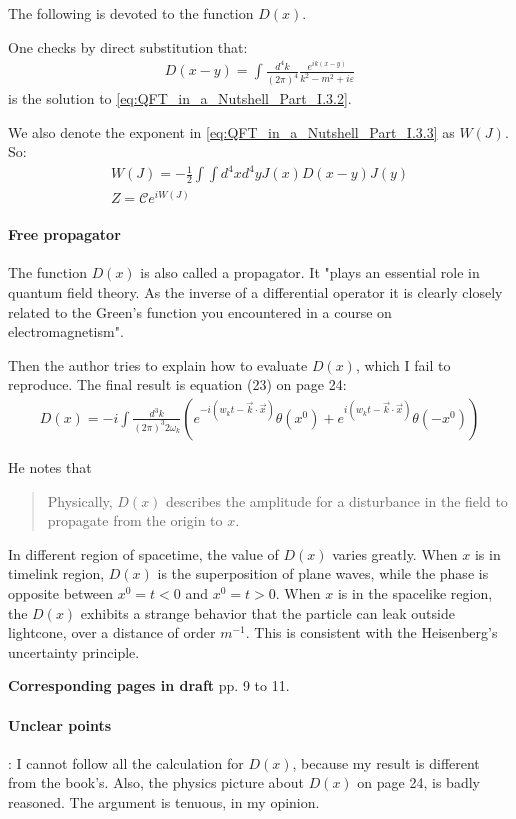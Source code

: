 \documentclass{book}
\numberwithin{equation}{subsection} %
\theoremstyle{definition}
\begin{document}
The following is devoted to the function $D(x)$.

One checks by direct substitution that:
\begin{align}
    D(x-y) = \int \frac{d^4k}{(2\pi)^4} 
        \frac{e^{ik(x-y)}}{k^2-m^2+i\varepsilon}
\end{align}
is the solution to \ref{eq:QFT_in_a_Nutshell_Part_I.3.2}.

We also denote the exponent in \ref{eq:QFT_in_a_Nutshell_Part_I.3.3}
as $W(J)$. So:
\begin{align}
    \label{eq:}
    W(J) = -\frac{1}{2} \int\int d^4x d^4y J(x)D(x-y)J(y) \\
    Z= \mathcal{C}e^{iW(J)}
\end{align}

\paragraph{Free propagator}

The function $D(x)$ is also called a propagator. It "plays an 
essential role in quantum field theory. As the inverse of a
differential operator it is clearly closely related to the Green’s
function you encountered in a course on electromagnetism".

Then the author tries to explain how to evaluate $D(x)$, which
I fail to reproduce. The final result is equation (23) on page 
24:
\begin{align}
    D(x)= -i\int \frac{d^3k}{(2\pi)^3 2\omega_k}
    \left( e^{-i(w_k t-\vec{k}\cdot\vec{x})} \theta(x^0)
        + e^{i(w_k t-\vec{k}\cdot\vec{x})} \theta(-x^0)
    \right)
\end{align}

He notes that
\begin{quote}
    Physically, $D(x)$ describes the amplitude for a disturbance 
    in the field to propagate from the origin to $x$. 
\end{quote}
In different region of spacetime, the value of $D(x)$ varies greatly.
When $x$ is in timelink region, $D(x)$ is the superposition of
plane waves, while the phase is opposite between $x^0=t<0$ and
$x^0=t>0$. When $x$ is in the spacelike region, the $D(x)$ exhibits
a strange behavior that the particle can leak outside lightcone,
over a distance of order $m^{-1}$. This is consistent with the
Heisenberg's uncertainty principle.

\textbf{Corresponding pages in draft} pp. 9 to 11.

\paragraph{Unclear points}: I cannot follow all the calculation for 
$D(x)$, because my result is different from the book's. Also, the
physics picture about $D(x)$ on page 24, is badly reasoned. The
argument is tenuous, in my opinion.
\end{document}
